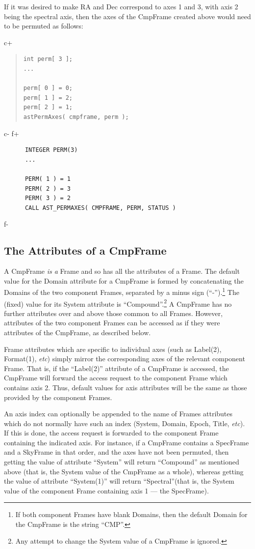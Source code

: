 \documentclass[twoside,11pt]{article}
\begin{document}
If it was desired to make RA and Dec correspond to axes 1 and 3, with
axis 2 being the spectral axis, then the axes of the CmpFrame created 
above would need to be permuted as follows:

c+
\begin{quote}
\small
\begin{verbatim}
int perm[ 3 ];
...

perm[ 0 ] = 0;
perm[ 1 ] = 2;
perm[ 2 ] = 1;
astPermAxes( cmpframe, perm ); 
\end{verbatim}
\normalsize
\end{quote}
c-
f+
\small
\begin{verbatim}
      INTEGER PERM(3)
      ...

      PERM( 1 ) = 1
      PERM( 2 ) = 3
      PERM( 3 ) = 2
      CALL AST_PERMAXES( CMPFRAME, PERM, STATUS ) 
\end{verbatim}
\normalsize
f-

\subsection{The Attributes of a CmpFrame}

A CmpFrame \emph{is a} Frame and so has all the attributes of a Frame.
The default value for the Domain attribute for a CmpFrame is formed by
concatenating the Domains of the two component Frames, separated by a
minus sign (``-'').\footnote{If both component Frames have blank Domains, 
then the default Domain for the CmpFrame is the string ``CMP''.} The (fixed) 
value for its System attribute is ``Compound''.\footnote{Any attempt to 
change the System value of a CmpFrame is ignored.} A CmpFrame has no 
further attributes over and above those common to all Frames. However,
attributes of the two component Frames can be accessed as if they were
attributes of the CmpFrame, as described below.

Frame attributes which are specific to individual axes (such as Label(2),
Format(1), \emph{etc}) simply mirror the corresponding axes of the
relevant component Frame. That is, if the ``Label(2)'' attribute of a
CmpFrame is accessed, the CmpFrame will forward the access request to the
component Frame which contains axis 2. Thus, default values for axis
attributes will be the same as those provided by the component Frames.

An axis index can optionally be appended to the name of Frames attributes
which do not normally have such an index (System, Domain, Epoch, Title,
\emph{etc}). If this is done, the access request is forwarded to the
component Frame containing the indicated axis. For instance, if a
CmpFrame contains a SpecFrame and a SkyFrame in that order, and the axes
have not been permuted, then getting the value of attribute ``System'' will 
return  ``Compound'' as mentioned above (that is, the System value of the
CmpFrame as a whole), whereas getting the value of attribute
``System(1)'' will return ``Spectral''(that is, the System value of the
component Frame containing axis 1 --- the SpecFrame).
\end{document}
